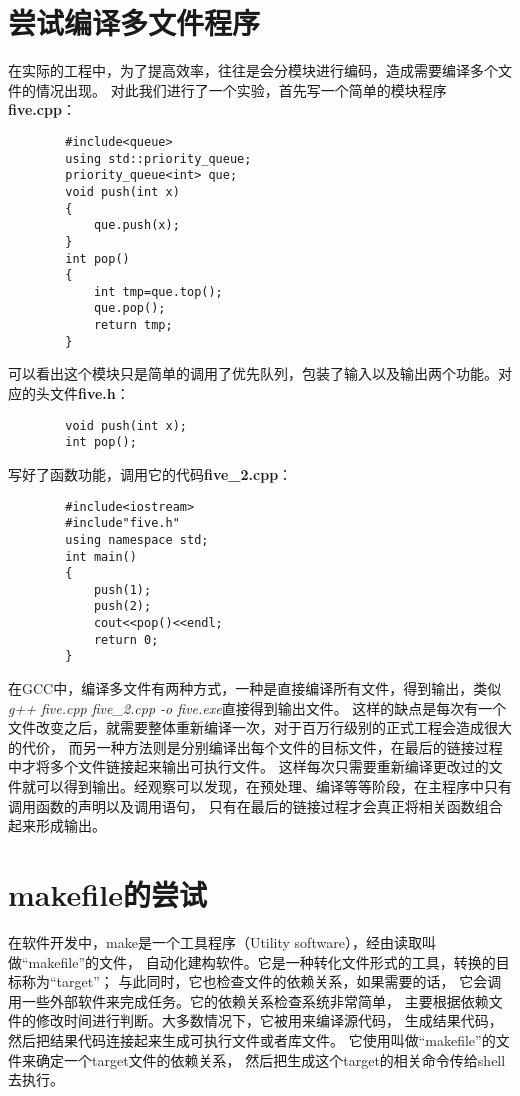 \documentclass[UTF8]{ctexart}
\begin{document}
    \section{尝试编译多文件程序}\label{multifile}
    在实际的工程中，为了提高效率，往往是会分模块进行编码，造成需要编译多个文件的情况出现。
    对此我们进行了一个实验，首先写一个简单的模块程序\textbf{five.cpp}：
    \begin{verbatim}
        #include<queue>
        using std::priority_queue;
        priority_queue<int> que;
        void push(int x)
        {
            que.push(x);
        }
        int pop()
        {
            int tmp=que.top();
            que.pop();
            return tmp;
        }
    \end{verbatim}
    可以看出这个模块只是简单的调用了优先队列，包装了输入以及输出两个功能。对应的头文件\textbf{five.h}：
    \begin{verbatim}
        void push(int x);
        int pop();
    \end{verbatim}
    写好了函数功能，调用它的代码\textbf{five\_2.cpp}：
    \begin{verbatim}
        #include<iostream>
        #include"five.h"
        using namespace std;
        int main()
        {
            push(1);
            push(2);
            cout<<pop()<<endl;
            return 0;
        }
    \end{verbatim}

    在GCC中，编译多文件有两种方式，一种是直接编译所有文件，得到输出，类似\emph{g++ five.cpp five\_2.cpp -o five.exe}直接得到输出文件。
    这样的缺点是每次有一个文件改变之后，就需要整体重新编译一次，对于百万行级别的正式工程会造成很大的代价，
    而另一种方法则是分别编译出每个文件的目标文件，在最后的链接过程中才将多个文件链接起来输出可执行文件。
    这样每次只需要重新编译更改过的文件就可以得到输出。经观察可以发现，在预处理、编译等等阶段，在主程序中只有调用函数的声明以及调用语句，
    只有在最后的链接过程才会真正将相关函数组合起来形成输出。
    \section{makefile的尝试}
    在软件开发中，make是一个工具程序（Utility software），经由读取叫做“makefile”的文件，
    自动化建构软件。它是一种转化文件形式的工具，转换的目标称为“target”；
    与此同时，它也检查文件的依赖关系，如果需要的话，
    它会调用一些外部软件来完成任务。它的依赖关系检查系统非常简单，
    主要根据依赖文件的修改时间进行判断。大多数情况下，它被用来编译源代码，
    生成结果代码，然后把结果代码连接起来生成可执行文件或者库文件。
    它使用叫做“makefile”的文件来确定一个target文件的依赖关系，
    然后把生成这个target的相关命令传给shell去执行。
\end{document}
